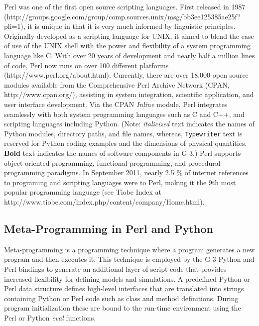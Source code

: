 \documentclass[10pt]{article}
\begin{document}
Perl was one of the first open source scripting languages. First
released in 1987
(http://groups.google.com/group/comp.sources.unix/msg/bb3ee125385ae25f?pli=1),
it is unique in that it is very much informed by linguistic
principles.  Originally developed as a scripting language for UNIX, it
aimed to blend the ease of use of the UNIX shell with the power and
flexibility of a system programming language like C.  With over 20
years of development and nearly half a million lines of code, Perl now
runs on over 100 different platforms (http://www.perl.org/about.html).  Currently, there are over 18,000
open source modules available from the Comprehensive Perl Archive
Network (CPAN, http://www.cpan.org/), assisting in system integration, scientific
application, and user interface development.  Via the CPAN {\it Inline}
module, Perl integrates seamlessly with both system programming
languages such as C and C++, and scripting languages including Python. (Note: {\it italicized} text indicates the names of Python modules, directory paths, and file names, whereas, {\tt Typewriter} text is reserved for Python coding examples and the dimensions of physical quantities. {\bf Bold} text indicates the names of software components in G-3.)
Perl supports object-oriented programming, functional programming, and
procedural programming paradigms. In September 2011, nearly
2.5 \% of internet references to programing and scripting languages were to Perl, making
it the 9th most popular programming
language (see Tiobe Index at http://www.tiobe.com/index.php/content/company/Home.html).

\subsection*{Meta-Programming in Perl and Python}

Meta-programming is a programming technique where a program generates
a new program and then executes it.  This technique is employed by
the G-3 Python and Perl bindings to generate an
additional layer of script code that provides increased flexibility
for defining models and simulations.  A predefined Python  or
Perl data structure defines high-level interfaces that are translated
into strings containing Python or Perl code such as class and method
definitions.  During program initialization these are bound to the run-time
environment using the Perl or Python {\it eval} functions.
\end{document}
